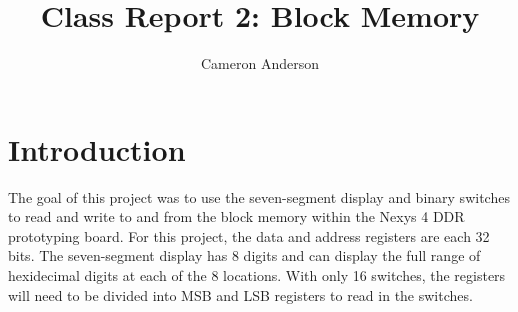 \documentclass{article}
\author{Cameron Anderson}
\title{Class Report 2: Block Memory}
\begin{document}
\maketitle

\section{Introduction}
The goal of this project was to use the seven-segment display and binary switches to read and write to and from the block memory within the Nexys 4 DDR prototyping board. For this project, the data and address registers are each 32 bits. The seven-segment display has 8 digits and can display the full range of hexidecimal digits at each of the 8 locations. With only 16 switches, the registers will need to be divided into MSB and LSB registers to read in the switches.
\end{document}
